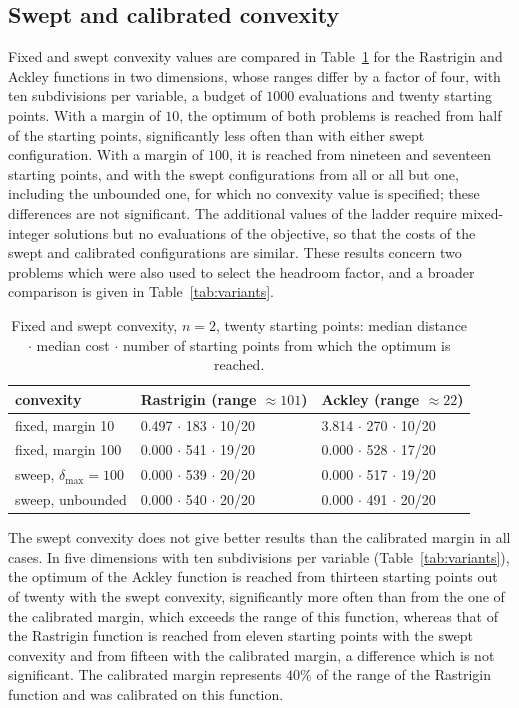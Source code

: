 \documentclass[pdflatex,sn-basic]{sn-jnl}
\begin{document}
\subsection{Swept and calibrated convexity}\label{sec:sweep-results}

Fixed and swept convexity values are compared in Table~\ref{tab:sweep} for the
Rastrigin and Ackley functions in two dimensions, whose ranges differ by a factor
of four, with ten subdivisions per variable, a budget of $1000$ evaluations and
twenty starting points. With a margin of $10$, the optimum of both problems is
reached from half of the starting points, significantly less often than with
either swept configuration. With a margin of $100$, it is reached from nineteen
and seventeen starting points, and with the swept configurations from all or
all but one, including the unbounded one, for which no convexity value is
specified; these differences are not significant. The
additional values of the ladder require mixed-integer solutions but no
evaluations of the objective, so that the costs of the swept and calibrated
configurations are similar. These results concern two problems which were also
used to select the headroom factor, and a broader comparison is given in
Table~\ref{tab:variants}.

\begin{table}[t]
  \centering
  \caption{Fixed and swept convexity, $n = 2$, twenty starting points: median
    distance $\cdot$ median cost $\cdot$ number of starting points from which the
    optimum is reached.}
  \label{tab:sweep}
  \begin{tabular}{lll}
    \toprule
    convexity & Rastrigin (range $\approx 101$) & Ackley (range $\approx 22$) \\
    \midrule
    fixed, margin 10                   & 0.497 $\cdot$ 183 $\cdot$ 10/20 & 3.814 $\cdot$ 270 $\cdot$ 10/20 \\
    fixed, margin 100                  & 0.000 $\cdot$ 541 $\cdot$ 19/20 & 0.000 $\cdot$ 528 $\cdot$ 17/20 \\
    sweep, $\delta_{\max} = 100$       & 0.000 $\cdot$ 539 $\cdot$ 20/20 & 0.000 $\cdot$ 517 $\cdot$ 19/20 \\
    sweep, unbounded                   & 0.000 $\cdot$ 540 $\cdot$ 20/20 & 0.000 $\cdot$ 491 $\cdot$ 20/20 \\
    \bottomrule
  \end{tabular}
\end{table}

The swept convexity does not give better results than the calibrated margin in
all cases. In five dimensions with ten subdivisions per variable
(Table~\ref{tab:variants}), the optimum of the Ackley function is reached from
thirteen starting points out of twenty with the swept convexity, significantly
more often than from the one of the calibrated margin, which exceeds the range
of this function, whereas that of the Rastrigin function is reached from eleven
starting points with the swept convexity and from fifteen with the calibrated
margin, a difference which is not significant. The calibrated margin represents
$40\%$ of the range of the Rastrigin function and was calibrated on this
function.
\end{document}
